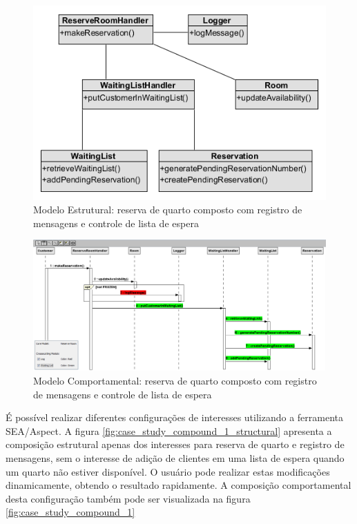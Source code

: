   \begin{figure}[!h]
	\centering
	\includegraphics[scale=0.8]{img/case_study_compound_2_structural.png}
	\caption{Modelo Estrutural: reserva de quarto composto com registro de mensagens e controle de lista de espera}\label{fig:case_study_compound_2_structural}
  \end{figure}
  
\begin{landscape}
  \begin{figure}
	\centering
	\includegraphics[scale=0.5]{img/case_study_compound_2.png}
	\caption{Modelo Comportamental: reserva de quarto composto com registro de mensagens e controle de lista de espera}\label{fig:case_study_compound_2}
  \end{figure}
\end{landscape}

É possível realizar diferentes configurações de interesses utilizando a ferramenta SEA/Aspect. A figura \ref{fig:case_study_compound_1_structural}
apresenta a composição estrutural apenas dos interesses para reserva de quarto e registro de mensagens, sem o interesse de adição de clientes em uma lista de
espera quando um quarto não estiver disponível. O usuário pode realizar estas modificações dinamicamente, obtendo o resultado rapidamente. A
composição comportamental desta configuração também pode ser visualizada na figura \ref{fig:case_study_compound_1}

